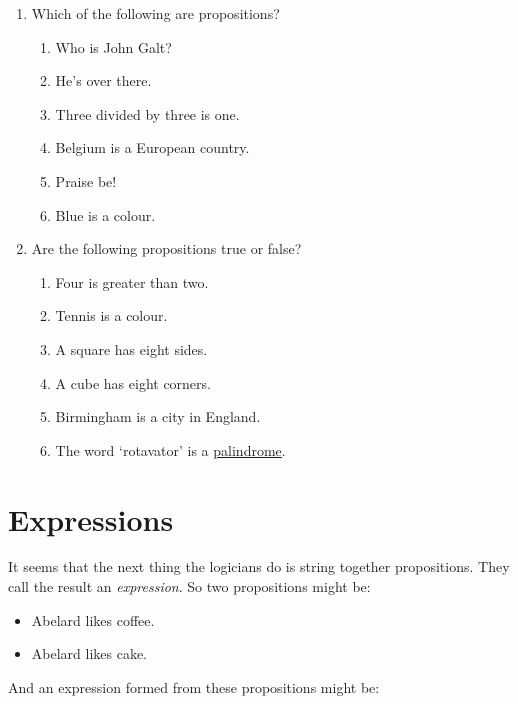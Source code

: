 \documentclass{article}
\begin{document}
      \begin{enumerate} 

        \item Which of the following are propositions?
          \begin{enumerate}
            \item Who is John Galt?
            \item He's over there.
            \item Three divided by three is one.
            \item Belgium is a European country.
            \item Praise be!
            \item Blue is a colour.
          \end{enumerate}

        \item Are the following propositions true or false?
          \begin{enumerate}
            \item Four is greater than two.
            \item Tennis is a colour.
            \item A square has eight sides.
            \item A cube has eight corners.
            \item Birmingham is a city in England.
            \item The word `rotavator' is a
              \href{http://en.wiktionary.org/wiki/palindrome}{palindrome}.
          \end{enumerate}

      \end{enumerate}

  \section{\label{sec:expressions}Expressions}

    It seems that the next thing the logicians do is string together
    propositions. They call the result an \emph{expression}. So two
    propositions might be:

    \begin{itemize}
      \item Abelard likes coffee.
      \item Abelard likes cake.
    \end{itemize}

    And an expression formed from these propositions might be:
\end{document}

